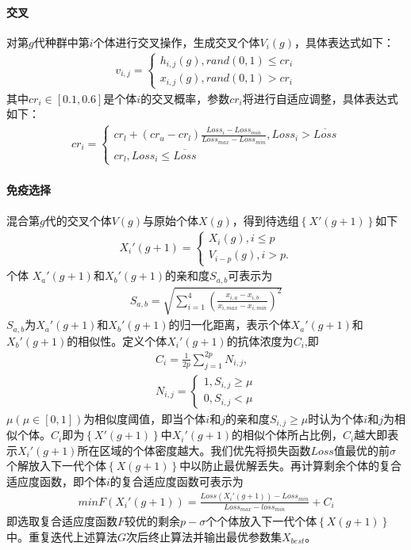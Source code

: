 \documentclass{whutmod}
\begin{document}
		\paragraph{交叉}
		对第$g$代种群中第$i$个体进行交叉操作，生成交叉个体$V_i(g)$，具体表达式如下：
		\begin{gather}
		v_{i,j}=\left\{\begin{matrix}h_{i,j}(g),rand(0,1)\leq cr_{i}
		\\ x_{i,j}(g),rand(0,1)>cr_{i}
		\end{matrix}\right.
		\end{gather}
     	其中$cr_{i}\in[0.1,0.6]$是个体$i$的交叉概率，参数$cr_{i}$将进行自适应调整，具体表达式如下：
		\begin{gather}
		cr_{i}=\left\{\begin{matrix}cr_{l}+(cr_{u}-cr_{l})\frac{Loss_{i}-Loss_{min}}{Loss_{max}-Loss_{min}} , Loss_{i}>\overline{Loss}
		\\ cr_{l},Loss_{i}\leqslant  \overline{Loss}
		\end{matrix}\right.
		\end{gather}
	    \paragraph{免疫选择}
	    混合第$g$代的交叉个体$V(g)$与原始个体$X(g)$，得到待选组$\left \{ X '(g+1)\right \}$如下
	    \begin{gather*}
	    X_i '(g+1)=\left\{\begin{matrix}  X_i (g),i\leqslant p
	    \\  V_{i-p} (g),i>p.
	    \end{matrix}\right.
	    \end{gather*}
		个体 $X_a '(g+1)$和$X_b '(g+1)$的亲和度$S_{a,b}$可表示为
		\begin{gather}
		S_{a,b}=\sqrt{\sum _{i=1}^4( \frac{x_{i,a}-x_{i,b}}{x_{i,max}-x_{i,min}})^2}
		\end{gather}
		$S_{a,b}$为$X_a '(g+1)$和$X_b '(g+1)$的归一化距离，表示个体$X_a '(g+1)$和$X_b '(g+1)$的相似性。定义个体$X_i '(g+1)$的抗体浓度为$C_{i}$,即
		\begin{gather}
		C_{i}=\frac{1}{2p}\sum _{j=1}^{2p} N_{i,j},\\
		N_{i,j}=\left\{\begin{matrix}1,S_{i,j}\geqslant \mu 
		\\ 0,S_{i,j}< \mu 
		\end{matrix}\right.
		\end{gather}
		$\mu(\mu\in[0,1])$为相似度阈值，即当个体$i$和$j$的亲和度$S_{i,j}\geqslant \mu$时认为个体$i$和$j$为相似个体。$C_{i}$即为$\left \{ X '(g+1)\right \}$中$X_i '(g+1)$的相似个体所占比例，$C_{i}$越大即表示$X_i '(g+1)$所在区域的个体密度越大。我们优先将损失函数$Loss$值最优的前$\sigma$个解放入下一代个体$\left \{ X(g+1)\right \}$中以防止最优解丢失。再计算剩余个体的复合适应度函数，即个体$i$的复合适应度函数可表示为
	    \begin{gather}
	  min F(X_i '(g+1))=\frac{Loss(X_i '(g+1))-Loss_{min}}{Loss_{max}-loss_{min}}+C_{i}
		\end{gather}
		即选取复合适应度函数$F$较优的剩余$p-\sigma$个个体放入下一代个体$\left \{ X(g+1)\right \}$中。重复迭代上述算法$G$次后终止算法并输出最优参数集$X_{best}$。
		
\end{document}
